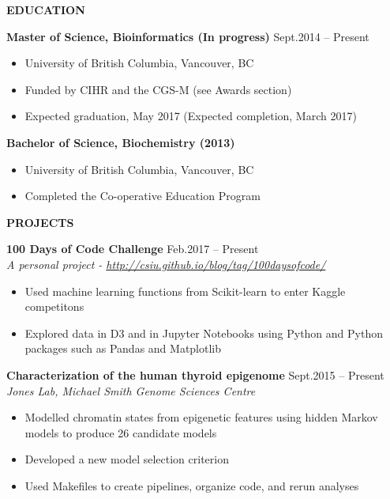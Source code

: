 \documentclass{res}
\renewcommand{\section}[1]{%
  \vspace{0.3in}%
  \centerline{\uppercase{\bf{#1}}}%
  \vspace{-6pt}}
\newcommand{\linehead}[2]{%
  {\bf #1} \hfill #2\\}
\newcommand{\linetitle}[1]{%
  {\sl #1}}
\begin{document}
\begin{resume}

\thispagestyle{empty} %

\section{Education}
\linehead{Master of Science, Bioinformatics (In progress)}{Sept.2014 -- Present}\vspace{-8pt}
\begin{itemize}
  \item University of British Columbia, Vancouver, BC
  \item Funded by CIHR and the CGS-M (see Awards section)
  \item Expected graduation, May 2017 (Expected completion, March 2017)
\end{itemize}

\linehead{Bachelor of Science, Biochemistry (2013)}{}\vspace{-8pt}
\begin{itemize}
  \item University of British Columbia, Vancouver, BC
  \item Completed the Co-operative Education Program
\end{itemize}

\section{Projects}
\linehead{100 Days of Code Challenge}{Feb.2017 -- Present}
\linetitle{A personal project - \url{http://csiu.github.io/blog/tag/100daysofcode/}}
\begin{itemize}
  \item Used machine learning functions from Scikit-learn to enter Kaggle competitons
  \item Explored data in D3 and in Jupyter Notebooks using Python and
  Python packages such as Pandas and Matplotlib
\end{itemize}

\linehead{Characterization of the human thyroid epigenome}{Sept.2015 -- Present}
\linetitle{Jones Lab, Michael Smith Genome Sciences Centre}
\begin{itemize}
  \item Modelled chromatin states from epigenetic features using hidden Markov models to produce 26 candidate models
  \item Developed a new model selection criterion
  \item Used Makefiles to create pipelines, organize code, and rerun analyses
\end{itemize}


\end{resume}
\end{document}
